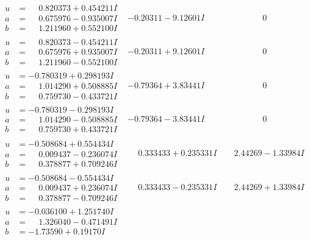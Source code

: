 \documentclass[1p]{elsarticle_modified}
\theoremstyle{definition}
\begin{document}
$$\begin{array}{c|c|c}
\begin{aligned}
u &= \phantom{-}0.820373 + 0.454211 I \\
a &= \phantom{-}0.675976 - 0.935007 I \\
b &= \phantom{-}1.211960 + 0.552100 I\end{aligned}
 & -0.20311 - 9.12601 I & \phantom{-0.000000 } 0 \\ \hline\begin{aligned}
u &= \phantom{-}0.820373 - 0.454211 I \\
a &= \phantom{-}0.675976 + 0.935007 I \\
b &= \phantom{-}1.211960 - 0.552100 I\end{aligned}
 & -0.20311 + 9.12601 I & \phantom{-0.000000 } 0 \\ \hline\begin{aligned}
u &= -0.780319 + 0.298193 I \\
a &= \phantom{-}1.014290 + 0.508885 I \\
b &= \phantom{-}0.759730 - 0.433721 I\end{aligned}
 & -0.79364 + 3.83441 I & \phantom{-0.000000 } 0 \\ \hline\begin{aligned}
u &= -0.780319 - 0.298193 I \\
a &= \phantom{-}1.014290 - 0.508885 I \\
b &= \phantom{-}0.759730 + 0.433721 I\end{aligned}
 & -0.79364 - 3.83441 I & \phantom{-0.000000 } 0 \\ \hline\begin{aligned}
u &= -0.508684 + 0.554434 I \\
a &= \phantom{-}0.009437 - 0.236074 I \\
b &= \phantom{-}0.378877 + 0.709246 I\end{aligned}
 & \phantom{-}0.333433 + 0.235331 I & \phantom{-}2.44269 - 1.33984 I \\ \hline\begin{aligned}
u &= -0.508684 - 0.554434 I \\
a &= \phantom{-}0.009437 + 0.236074 I \\
b &= \phantom{-}0.378877 - 0.709246 I\end{aligned}
 & \phantom{-}0.333433 - 0.235331 I & \phantom{-}2.44269 + 1.33984 I \\ \hline\begin{aligned}
u &= -0.036100 + 1.251740 I \\
a &= \phantom{-}1.326040 - 0.471491 I \\
b &= -1.73590 + 0.19170 I\end{aligned}

\end{array}$$
\end{document}

